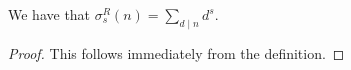 \begin{theorem}
\label{sigmaR_apply}
\leanok
We have that $\sigma^R_s(n)=\sum_{d\mid n}d^s.$
\end{theorem}
\begin{proof}
\leanok
This follows immediately from the definition.
\end{proof}
